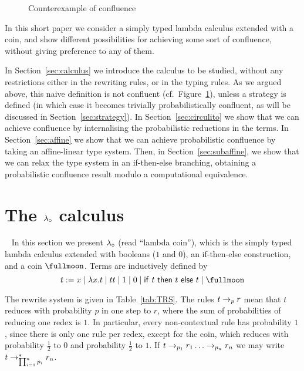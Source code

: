 \begin{figure}[t]
  \centering
  \caption{Counterexample of confluence}
  \label{fig:noconfl}
\end{figure}

In this short paper we consider a simply typed lambda calculus extended with 
a coin, and show different possibilities for achieving some sort of confluence, without giving preference to any of them.

In Section~\ref{sec:calculus} we introduce the calculus to be studied, without any restrictions either in the rewriting rules, or in the typing rules. As we argued above, this naive definition is not confluent (cf.~Figure~\ref{fig:noconfl}), unless a strategy is defined (in which case it becomes trivially probabilistically confluent, as will be discussed in Section~\ref{sec:strategy}).
In Section~\ref{sec:circulito} we show that we can achieve confluence by internalising the probabilistic reductions in the terms. In Section~\ref{sec:affine} we show that we can achieve probabilistic confluence by taking an affine-linear type system. Then, in Section~\ref{sec:subaffine}, we show that we can relax the type system in an if-then-else branching, obtaining a probabilistic confluence result modulo a computational equivalence.

\section{The \texorpdfstring{$\lambprot$}{lambda coin} calculus}~\label{sec:calculus}
In this section we present 
$\lambprot$ (read ``lambda coin''), which is the
simply typed lambda calculus extended with booleans ($1$ and $0$), an if-then-else construction, and a coin $\coin$.
%
Terms are inductively defined by 
\[
  t := x\mid \lambda x.t \mid tt \mid 1\mid 0\mid \ite ttt\mid \coin
\]

The rewrite system is given in Table~\ref{tab:TRS}. The rules $t\topr[p]r$ mean that $t$ reduces with probability $p$ in one step to $r$, where the sum of probabilities of reducing one redex is $1$. In particular, every non-contextual rule has probability $1$, since there is only one rule per redex, except for the coin, which reduces with probability $\frac 12$ to $0$ and probability $\frac 12$ to $1$. If $t\topr[p_1]r_1\dots\topr[p_n]r_n$ we may write $t\topr[\prod_{i=1}^np_i]^*r_n$.

